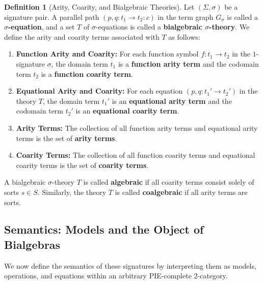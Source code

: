 \documentclass[11pt]{article}
\theoremstyle{plain}
\theoremstyle{definition}
\newtheorem{definition}[theorem]{Definition}
\numberwithin{equation}{section}
\begin{document}
\begin{definition}[Arity, Coarity, and Bialgebraic Theories]
   Let $(\Sigma,\sigma)$ be a signature pair. A parallel path $(p, q \colon t_1 \to t_2\colon c)$ in the term graph $G_\sigma$ is called a \textbf{$\sigma$-equation}, and a set $T$ of  $\sigma$-equations is called a \textbf{bialgebraic $\sigma$-theory}. We define the arity and coarity terms associated with $T$ as follows:
   \begin{enumerate}
       \item \textbf{Function Arity and Coarity:} For each function symbol $f \colon t_1 \to t_2$ in the $1$-signature $\sigma$, the domain term $t_1$ is a \textbf{function arity term} and the codomain term $t_2$ is a \textbf{function coarity term}.
       \item \textbf{Equational Arity and Coarity:} For each equation $(p, q \colon t_1' \to t_2')$ in the theory $T$, the domain term $t_1'$ is an \textbf{equational arity term} and the codomain term $t_2'$ is an \textbf{equational coarity term}.
       \item \textbf{Arity Terms:} The collection of all function arity terms and equational arity terms is the set of \textbf{arity terms}.
       \item \textbf{Coarity Terms:} The collection of all function coarity terms and equational coarity terms is the set of \textbf{coarity terms}.
   \end{enumerate}
   A bialgebraic $\sigma$-theory $T$ is called \textbf{algebraic} if all coarity terms consist solely of sorts $s \in S$. Similarly, the theory $T$ is called \textbf{coalgebraic} if all arity terms are sorts. 
\end{definition}

\subsection{Semantics: Models and the Object of Bialgebras}

We now define the semantics of these signatures by interpreting them as models, operations, and equations within an arbitrary PIE-complete $2$-category.
\end{document}
